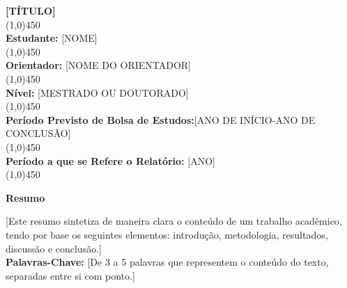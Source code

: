 \documentclass[12pt]{letter}
\begin{document}
\thispagestyle{fancy}

\begin{flushleft}

\textbf{[TÍTULO]}\\
\line(1,0){450}
\\\textbf{Estudante:} [NOME]\\
\line(1,0){450}
\\\textbf{Orientador:} [NOME DO ORIENTADOR]\\
\line(1,0){450}
\\\textbf{Nível:} [MESTRADO OU DOUTORADO]\\
\line(1,0){450}
\\\textbf{Período Previsto de Bolsa de Estudos:}[ANO  DE INÍCIO-ANO DE CONCLUSÃO] \\
\line(1,0){450}
\\\textbf{Período a que se Refere o Relatório:} [ANO]\\
\line(1,0){450}

\textbf{Resumo}
\\
\vspace{10 mm}

[Este resumo sintetiza de maneira clara o conteúdo de um trabalho acadêmico,
tendo por base os seguintes elementos: introdução, metodologia, resultados,
discussão e conclusão.]
\\

\vspace{10 mm}
\textbf{Palavras-Chave:}
[De 3 a 5 palavras que representem o conteúdo do texto, separadas entre si
com ponto.]

\end{flushleft}
\end{document}
